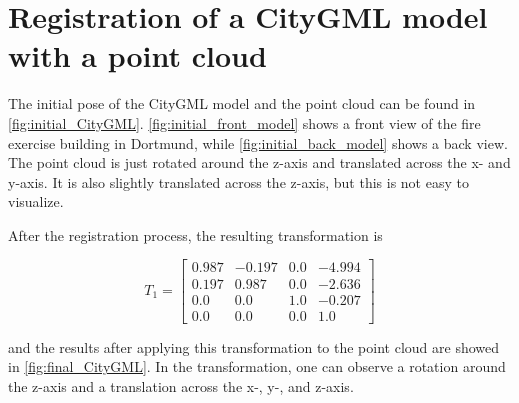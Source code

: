    \section{Registration of a CityGML model with a point cloud}
        The initial pose of the CityGML model and the point cloud can be found in \autoref{fig:initial_CityGML}.
        \autoref{fig:initial_front_model} shows a front view of the fire exercise building in Dortmund, while \autoref{fig:initial_back_model} shows a back view.
        The point cloud is just rotated around the z-axis and translated across the x- and y-axis.
        It is also slightly translated across the z-axis, but this is not easy to visualize.

        After the registration process, the resulting transformation is

        \begin{equation*}
            T_1 = 
            \begin{bmatrix}0.987 & -0.197 & 0.0 & -4.994 \\ 
                0.197 & 0.987 & 0.0 & -2.636 \\
                0.0 & 0.0 & 1.0 & -0.207 \\
                0.0 & 0.0 & 0.0 & 1.0
            \end{bmatrix}
        \end{equation*}

        and the results after applying this transformation to the point cloud are showed in \autoref{fig:final_CityGML}.
        In the transformation, one can observe a rotation around the z-axis and a translation across the x-, y-, and z-axis.

